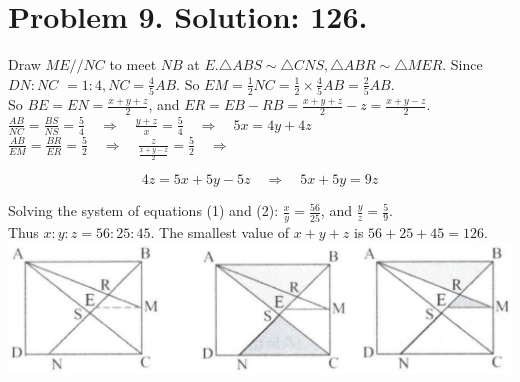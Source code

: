\documentclass[10pt]{article}
\begin{document}
\section*{Problem 9. Solution: 126.}
Draw \(M E / / N C\) to meet \(N B\) at \(E . \triangle A B S \sim \triangle C N S, \triangle A B R \sim \triangle M E R\). Since \(D N: N C\) \(=1: 4, N C=\frac{4}{5} A B\). So \(E M=\frac{1}{2} N C=\frac{1}{2} \times \frac{4}{5} A B=\frac{2}{5} A B\).\\
So \(B E=E N=\frac{x+y+z}{2}\), and \(E R=E B-R B=\frac{x+y+z}{2}-z=\frac{x+y-z}{2}\).\\
\(\frac{A B}{N C}=\frac{B S}{N S}=\frac{5}{4} \quad \Rightarrow \quad \frac{y+z}{x}=\frac{5}{4} \quad \Rightarrow \quad 5 x=4 y+4 z\)\\
\(\frac{A B}{E M}=\frac{B R}{E R}=\frac{5}{2} \quad \Rightarrow \quad \frac{z}{\frac{x+y-z}{2}}=\frac{5}{2} \quad \Rightarrow\)

\[
4 z=5 x+5 y-5 z \quad \Rightarrow \quad 5 x+5 y=9 z
\]

Solving the system of equations (1) and (2): \(\frac{x}{y}=\frac{56}{25}\), and \(\frac{y}{z}=\frac{5}{9}\).\\
Thus \(x: y: z=56: 25: 45\). The smallest value of \(x+y+z\) is \(56+25+45=126\).\\
\includegraphics[max width=\textwidth, center]{2025_04_17_97bc1f7e44d93c271a88g-135(2)}
\end{document}
